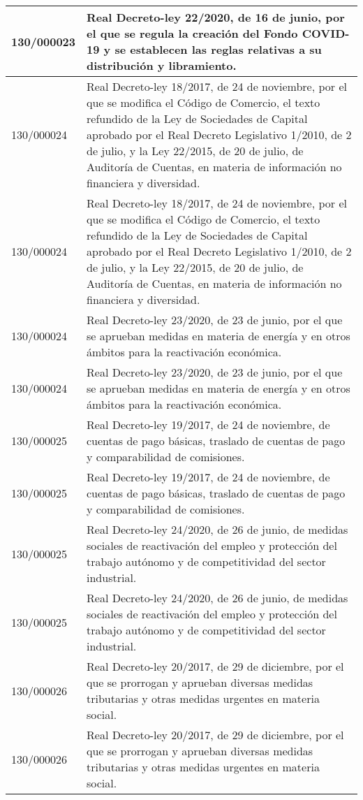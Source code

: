 {\begin{table}[H]
\begin{center}
\begin{tabularx}{\linewidth}{| l | X |}
\hline
130/000023 & Real Decreto-ley 22/2020, de 16 de junio, por el que se regula la creación del Fondo COVID-19 y se establecen las reglas relativas a su distribución y libramiento. \\
\hline
130/000024 & Real Decreto-ley 18/2017, de 24 de noviembre, por el que se modifica el Código de Comercio, el texto refundido de la Ley de Sociedades de Capital aprobado por el Real Decreto Legislativo 1/2010, de 2 de julio, y la Ley 22/2015, de 20 de julio, de Auditoría de Cuentas, en materia de información no financiera y diversidad. \\
\hline
130/000024 & Real Decreto-ley 18/2017, de 24 de noviembre, por el que se modifica el Código de Comercio, el texto refundido de la Ley de Sociedades de Capital aprobado por el Real Decreto Legislativo 1/2010, de 2 de julio, y la Ley 22/2015, de 20 de julio, de Auditoría de Cuentas, en materia de información no financiera y diversidad. \\
\hline
130/000024 & Real Decreto-ley 23/2020, de 23 de junio, por el que se aprueban medidas en materia de energía y en otros ámbitos para la reactivación económica. \\
\hline
130/000024 & Real Decreto-ley 23/2020, de 23 de junio, por el que se aprueban medidas en materia de energía y en otros ámbitos para la reactivación económica. \\
\hline
130/000025 & Real Decreto-ley 19/2017, de 24 de noviembre, de cuentas de pago básicas, traslado de cuentas de pago y comparabilidad de comisiones. \\
\hline
130/000025 & Real Decreto-ley 19/2017, de 24 de noviembre, de cuentas de pago básicas, traslado de cuentas de pago y comparabilidad de comisiones. \\
\hline
130/000025 & Real Decreto-ley 24/2020, de 26 de junio, de medidas sociales de reactivación del empleo y protección del trabajo autónomo y de competitividad del sector industrial. \\
\hline
130/000025 & Real Decreto-ley 24/2020, de 26 de junio, de medidas sociales de reactivación del empleo y protección del trabajo autónomo y de competitividad del sector industrial. \\
\hline
130/000026 & Real Decreto-ley 20/2017, de 29 de diciembre, por el que se prorrogan y aprueban diversas medidas tributarias y otras medidas urgentes en materia social. \\
\hline
130/000026 & Real Decreto-ley 20/2017, de 29 de diciembre, por el que se prorrogan y aprueban diversas medidas tributarias y otras medidas urgentes en materia social. \\

\end{tabularx}
\end{center}
\end{table}}
